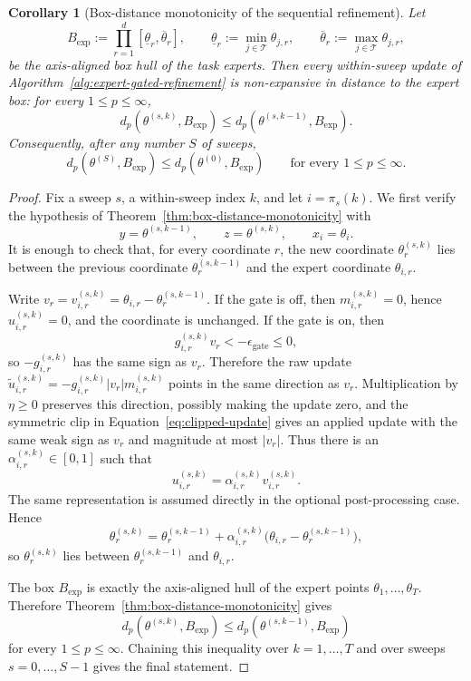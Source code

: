 \documentclass[11pt]{article}
\newcommand{\tasks}{\mathcal{T}}
\newtheorem{corollary}{Corollary}
\begin{document}
\begin{corollary}[Box-distance monotonicity of the sequential refinement]
\label{cor:algorithm-box-distance}
Let
\[
B_{\mathrm{exp}}
:=
\prod_{r=1}^d
[\underline{\theta}_r,\overline{\theta}_r],
\qquad
\underline{\theta}_r := \min_{j\in\tasks}\theta_{j,r},
\qquad
\overline{\theta}_r := \max_{j\in\tasks}\theta_{j,r},
\]
be the axis-aligned box hull of the task experts. Then every
within-sweep update of Algorithm~\ref{alg:expert-gated-refinement} is
non-expansive in distance to the expert box: for every $1\le p\le\infty$,
\[
    d_p\!\left(\theta^{(s,k)},B_{\mathrm{exp}}\right)
    \le
    d_p\!\left(\theta^{(s,k-1)},B_{\mathrm{exp}}\right).
\]
Consequently, after any number $S$ of sweeps,
\[
    d_p\!\left(\theta^{(S)},B_{\mathrm{exp}}\right)
    \le
    d_p\!\left(\theta^{(0)},B_{\mathrm{exp}}\right)
    \qquad\text{for every }1\le p\le\infty.
\]
\end{corollary}

\begin{proof}
Fix a sweep $s$, a within-sweep index $k$, and let $i=\pi_s(k)$. We first
verify the hypothesis of Theorem~\ref{thm:box-distance-monotonicity} with
\[
    y=\theta^{(s,k-1)},
    \qquad
    z=\theta^{(s,k)},
    \qquad
    x_i=\theta_i.
\]
It is enough to check that, for every coordinate $r$, the new coordinate
$\theta_r^{(s,k)}$ lies between the previous coordinate
$\theta_r^{(s,k-1)}$ and the expert coordinate $\theta_{i,r}$.

Write $v_r=v_{i,r}^{(s,k)}=\theta_{i,r}-\theta_r^{(s,k-1)}$. If the gate is
off, then $m_{i,r}^{(s,k)}=0$, hence $u_{i,r}^{(s,k)}=0$, and the coordinate
is unchanged. If the gate is on, then
\[
    g_{i,r}^{(s,k)} v_r < -\epsilon_{\mathrm{gate}} \le 0,
\]
so $-g_{i,r}^{(s,k)}$ has the same sign as $v_r$. Therefore the raw update
$\widetilde u_{i,r}^{(s,k)}=-g_{i,r}^{(s,k)}|v_r|m_{i,r}^{(s,k)}$ points in
the same direction as $v_r$. Multiplication by $\eta\ge0$ preserves this
direction, possibly making the update zero, and the symmetric clip in
Equation~\eqref{eq:clipped-update} gives an applied update with the same weak sign as $v_r$ and magnitude at most $|v_r|$.
Thus there is an $\alpha_{i,r}^{(s,k)}\in[0,1]$ such that
\[
    u_{i,r}^{(s,k)}=\alpha_{i,r}^{(s,k)}v_{i,r}^{(s,k)}.
\]
The same representation is assumed directly in the optional post-processing
case. Hence
\[
    \theta_r^{(s,k)}
    =
    \theta_r^{(s,k-1)}
    +
    \alpha_{i,r}^{(s,k)}
    \bigl(\theta_{i,r}-\theta_r^{(s,k-1)}\bigr),
\]
so $\theta_r^{(s,k)}$ lies between $\theta_r^{(s,k-1)}$ and $\theta_{i,r}$.

The box $B_{\mathrm{exp}}$ is exactly the axis-aligned hull of the expert
points $\theta_1,\dots,\theta_T$. Therefore
Theorem~\ref{thm:box-distance-monotonicity} gives
\[
    d_p\!\left(\theta^{(s,k)},B_{\mathrm{exp}}\right)
    \le
    d_p\!\left(\theta^{(s,k-1)},B_{\mathrm{exp}}\right)
\]
for every $1\le p\le\infty$. Chaining this inequality over
$k=1,\dots,T$ and over sweeps $s=0,\dots,S-1$ gives the final statement.
\end{proof}
\end{document}
